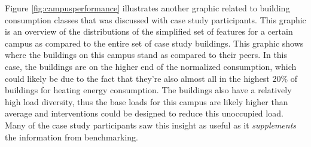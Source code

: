Figure \ref{fig:campusperformance} illustrates another graphic related to building consumption classes that was discussed with case study participants. This graphic is an overview of the distributions of the simplified set of features for a certain campus as compared to the entire set of case study buildings. This graphic shows where the buildings on this campus stand as compared to their peers. In this case, the buildings are on the higher end of the normalized consumption, which could likely be due to the fact that they're also almost all in the highest 20\% of buildings for heating energy consumption. The buildings also have a relatively high load diversity, thus the base loads for this campus are likely higher than average and interventions could be designed to reduce this unoccupied load. Many of the case study participants saw this insight as useful as it \emph{supplements} the information from benchmarking.